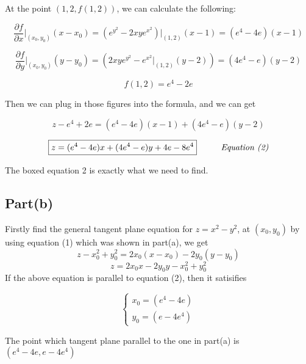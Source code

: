 \documentclass[12pt]{article}
\begin{document}
At the point $(1,2,f(1,2))$, we can calculate the following:

\[ \frac{\partial f}{\partial x}\bigg|_{(x_0,y_0)}(x-x_0) = 
(e^{y^2}-2xye^{x^2})\bigg|_{(1,2)}(x-1) = (e^4-4e)(x-1)\]

\[ \frac{\partial f}{\partial y}\bigg|_{(x_0,y_0)}(y-y_0) = 
(2xye^{y^2}-e^{x^2}\bigg|_{(1,2)}(y-2)) = (4e^4-e)(y-2) \]

\[ f(1,2) = e^4-2e \]

Then we can plug in those figures into the formula, and we can get

\[ z - e^4 + 2e = (e^4-4e)(x-1)+(4e^4-e)(y-2) \]

\[ \boxed{z = (e^4-4e)x + (4e^4-e)y + 4e-8e^4} \hspace*{1cm} \textit{Equation (2)}\]

\begin{center}
    The boxed equation 2 is exactly what we need to find.
\end{center}

\newpage
\subsection*{Part(b)}
Firstly find the general tangent plane equation for $ z = x^2 - y^2$,
at $(x_0,y_0)$
by using equation (1) which was shown in part(a), we get
\[ z - x_0^2 + y_0^2 = 2x_0(x-x_0) - 2y_0(y-y_0) \]
\[ \boxed{z = 2x_0x - 2y_0y -x_0^2 + y_0^2} \]
If the above equation is parallel to equation (2), then it satisifies

\[ \begin{cases}
    x_0 = (e^4-4e)\\
    y_0 = (e-4e^4)
\end{cases} \]

The point which tangent plane parallel to the one in part(a) is
$ (e^4-4e,e-4e^4)$

\newpage
\end{document}
